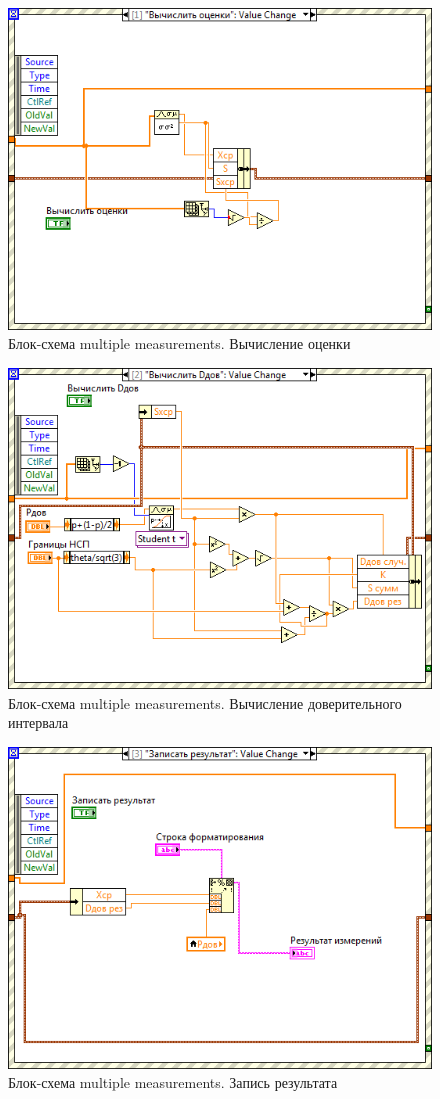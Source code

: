 \documentclass[a4paper,14pt]{article}
\begin{document}
 \begin{figure}[H]
    \centering
    \includegraphics[width=0.7\linewidth]{image/mp_schema_1}
    \caption{Блок-схема multiple measurements. Вычисление оценки}\label{img:mp_schema_calc_score}
\end{figure}
 \begin{figure}[H]
    \centering
    \includegraphics[width=\linewidth]{image/mp_schema_2}
    \caption{Блок-схема multiple measurements. Вычисление доверительного интервала}\label{img:mp_schema_calc_D}
\end{figure}
\begin{figure}[H]
    \centering
    \includegraphics[width=0.7\linewidth]{image/mp_schema_3}
    \caption{Блок-схема multiple measurements. Запись результата}\label{img:mp_schema_write}
\end{figure}
\end{document}

